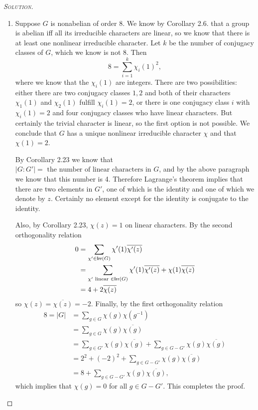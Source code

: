 \begin{proof}[{\scshape Solution}]
  \hfill
  \begin{enumerate}[font=\normalfont,label=\textbf{(\Alph*)}, wide]


    \item Suppose $G$ is nonabelian of order 8. We know by Corollary 2.6. that a group is abelian iff all its irreducible characters are linear, so we know that there is at least one nonlinear irreducible character. Let $k$ be the number of conjugacy classes of $G$, which we know is not 8. Then
    \[
    8 = \sum_{i=1}^k \chi_i(1)^2,
    \]
    where we know that the $\chi_i(1)$ are integers. There are two possibilities: either there are two conjugacy classes $1, 2$ and both of their characters $\chi_1(1)$ and $\chi_2(1)$ fulfill $ \chi_i(1) =2$, or there is one conjugacy class $i$ with $\chi_i(1)= 2$ and four conjugacy classes who have linear characters. But certainly the trivial character is linear, so the first option is not possible. We conclude that $G$ has a unique nonlinear irreducible character $\chi$ and that $\chi(1) = 2$.

    By Corollary 2.23 we know that $\lvert G : G' \rvert = \text{ the number of linear characters in $G$}$, and by the above paragraph we know that this number is 4. Therefore Lagrange's theorem implies that there are two elements in $G'$, one of which is the identity and one of which we denote by $z$. Certainly no element except for the identity is conjugate to the identity.
\begin{comment}
 It is clear that this implies that $z = z^{-1}$.
    Since the commutator subgroup is normal, $gG'g^{-1} = G'$ for all $g\in G$. However we cannot have $gzg^{-1} = 1$ since $z$ is not the identity, so it follows that $gzg^{-1} = z$ for all $g \in G$.
\end{comment}
    Also, by Corollary 2.23, $\chi(z) = 1$ on linear characters. By the second orthogonality relation
    \[
    \begin{aligned}
      0
      &=  \sum_{\chi' \in \mathsf{Irr}(G)} \chi'(1) \overline{\chi'(z)} \\
      &= \sum_{\chi' \text{ linear } \in \mathsf{Irr}(G)} \chi'(1) \overline{\chi'(z)} + \chi(1)\overline{\chi(z)}\\
      &= 4 + 2\overline{\chi(z)}
    \end{aligned}
    \]
    so $\chi(z) = \overline{\chi(z)} = -2$. Finally, by the first orthogonality relation
    \[
    \begin{aligned}
      8 = \lvert G \rvert
      &= \sum_{g \in G} \chi(g)\chi(g^{-1}) \\
      &= \sum_{g \in G} \chi(g)\overline{\chi(g)} \\
      &= \sum_{g \in G'} \chi(g)\overline{\chi(g)} + \sum_{g \in G-G'} \chi(g)\overline{\chi(g)} \\
      &= 2^2 + (-2)^2 + \sum_{g \in G-G'} \chi(g)\overline{\chi(g)} \\
      &= 8 + \sum_{g \in G-G'} \chi(g)\overline{\chi(g)},
    \end{aligned}
    \]
    which implies that $\chi(g) = 0$ for all $g \in G-G'$. This completes the proof.


\end{enumerate}
\end{proof}
